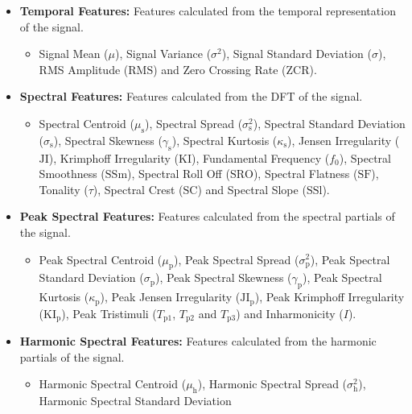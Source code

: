 		\begin{itemize}
			\item {\bf{Temporal Features:}} Features calculated from the temporal representation of the signal.
			\begin{itemize}
				\item Signal Mean ($\mu$), Signal Variance ($\sigma^{2}$), Signal Standard Deviation
				      ($\sigma$), RMS Amplitude ($\mathrm{RMS}$) and Zero Crossing Rate ($\mathrm{ZCR}$).
			\end{itemize}
			\item {\bf{Spectral Features:}} Features calculated from the DFT of the signal.
			\begin{itemize}
				\item Spectral Centroid ($\mu_{\mathrm{s}}$), Spectral Spread ($\sigma_{\mathrm{s}}^{2}$),
				      Spectral Standard Deviation ($\sigma_{\mathrm{s}}$), Spectral Skewness
				      ($\gamma_{\mathrm{s}}$), Spectral Kurtosis ($\kappa_{\mathrm{s}}$), Jensen
				      Irregularity ($\mathrm{JI}$), Krimphoff Irregularity ($\mathrm{KI}$), Fundamental
				      Frequency ($f_{0}$), Spectral Smoothness ($\mathrm{SSm}$), Spectral Roll Off
				      ($\mathrm{SRO}$), Spectral Flatness ($\mathrm{SF}$), Tonality ($\tau$), Spectral
				      Crest ($\mathrm{SC}$) and Spectral Slope ($\mathrm{SSl}$).
			\end{itemize}
			\item {\bf{Peak Spectral Features:}} Features calculated from the spectral partials of the signal.
			\begin{itemize}
				\item Peak Spectral Centroid ($\mu_{\mathrm{p}}$), Peak Spectral Spread
				      ($\sigma_{\mathrm{p}}^{2}$), Peak Spectral Standard Deviation
				      ($\sigma_{\mathrm{p}}$), Peak Spectral Skewness ($\gamma_{\mathrm{p}}$), Peak
				      Spectral Kurtosis ($\kappa_{\mathrm{p}}$), Peak Jensen Irregularity
				      ($\mathrm{JI_{p}}$), Peak Krimphoff Irregularity
				      ($\mathrm{KI_{p}}$), Peak Tristimuli ($T_{\mathrm{p}1}$, $T_{\mathrm{p}2}$
				      and $T_{\mathrm{p}3}$) and Inharmonicity ($I$).
			\end{itemize}
			\item {\bf{Harmonic Spectral Features:}} Features calculated from the harmonic partials of the
			      signal.
			\begin{itemize}
				\item Harmonic Spectral Centroid ($\mu_{\mathrm{h}}$), Harmonic Spectral Spread
				      ($\sigma_{\mathrm{h}}^{2}$), Harmonic Spectral Standard Deviation

\end{itemize}
\end{itemize}
